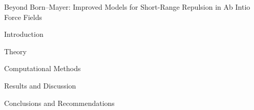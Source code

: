 \begin{chapter}{Beyond Born--Mayer: Improved Models for Short-Range Repulsion
in Ab Intio Force Fields}
\label{ch:isaff}

%
\begin{section}{Introduction}
\label{sec:isotropic-intro}




\end{section}




\begin{section}{Theory}
\label{sec:isotropic-theory}



\end{section}





\begin{section}{Computational Methods}
\label{sec:isotropic-methods}



\end{section}




\begin{section}{Results and Discussion}
\label{sec:isotropic-results}



\end{section}





\begin{section}{Conclusions and Recommendations}
\label{sec:isotropic-conclusions}



\end{section}

\begin{subappendices}
 
\end{subappendices}


\end{chapter}
